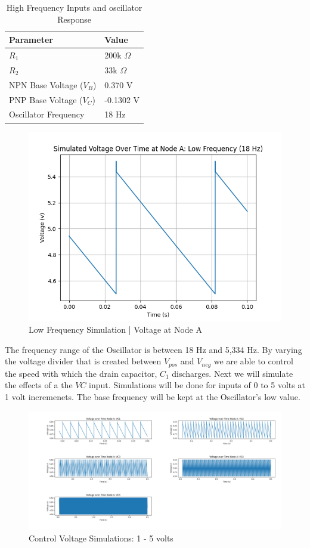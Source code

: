 \documentclass{article}
\begin{document}
\begin{center}
  \begin{table}[H]
    \centering
    \begin{tabular}{ll}
    \toprule
    Parameter & Value \\
    \midrule
    $R_1$ & 200k $\Omega$ \\
    $R_2$ & 33k $\Omega$ \\
    NPN Base Voltage ($V_B$) & 0.370 V \\
    PNP Base Voltage ($V_C$) & -0.1302 V \\
    Oscillator Frequency & 18 Hz \\
    \bottomrule
    \end{tabular}
    \caption{High Frequency Inputs and oscillator Response}
    \end{table}
\end{center}
\vspace{-1.5cm}
\begin{figure}[H]
  \centering
  \includegraphics[width=.7\linewidth]{png/Figure_2.png}
  \caption{Low Frequency Simulation | Voltage at Node A}
\end{figure}


The frequency range of the Oscillator is between 18 Hz and 5,334 Hz. By varying the voltage divider that is created between $V_{pos}$ and $V_{neg}$ we are able to control the speed with which the drain capacitor, $C_1$ discharges. Next we will simulate the effects of a the $VC$ input. Simulations will be done for inputs of 0 to 5 volts at 1 volt incremenets. The base frequency will be kept at the Oscillator's low value.

\begin{figure}[H]
  \centering
  \includegraphics[width=1\linewidth]{png/Figure_3.png}
  \caption{Control Voltage Simulations: 1 - 5 volts}
\end{figure}
\end{document}
